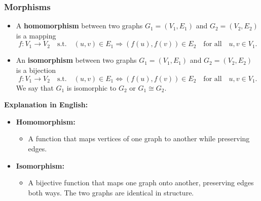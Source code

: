     \subsubsection{Morphisms}
    \begin{definition}
        \begin{itemize}
            \item A \textbf{homomorphism} between two graphs $G_1 = (V_1, E_1)$ and $G_2 = (V_2, E_2)$ is a mapping
            \[
            f: V_1 \to V_2 \quad \text{s.t.} \quad (u, v) \in E_1 \Rightarrow (f(u), f(v)) \in E_2 \quad \text{for all} \quad u, v \in V_1.
            \]
            \item An \textbf{isomorphism} between two graphs $G_1 = (V_1, E_1)$ and $G_2 = (V_2, E_2)$ is a bijection
            \[
            f: V_1 \to V_2 \quad \text{s.t.} \quad (u, v) \in E_1 \iff (f(u), f(v)) \in E_2 \quad \text{for all} \quad u, v \in V_1.
            \]
            We say that $G_1$ is isomorphic to $G_2$ or $G_1 \cong G_2$.
        \end{itemize}
        
        \textbf{Explanation in English:}
        \begin{itemize}
            \item \textbf{Homomorphism:}
            \begin{itemize}
                \item A function that maps vertices of one graph to another while preserving edges.
            \end{itemize}

            \item \textbf{Isomorphism:}
            \begin{itemize}
                \item A bijective function that maps one graph onto another, preserving edges both ways. The two graphs are identical in structure.
            \end{itemize}
        \end{itemize}
    \end{definition}
